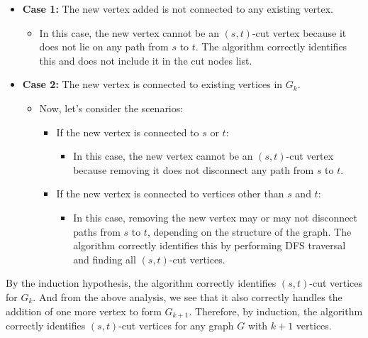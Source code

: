 \documentclass{article}
\begin{document}
            \begin{itemize}
                \item \textbf{Case 1:} The new vertex added is not connected to any existing vertex.
                \begin{itemize}
                    \item In this case, the new vertex cannot be an $(s, t)$-cut vertex because it does not lie on any path from $s$ to $t$. The algorithm correctly identifies this and does not include it in the cut nodes list.
                \end{itemize}
                
                \item \textbf{Case 2:} The new vertex is connected to existing vertices in $G_k$.
                \begin{itemize}
                    \item Now, let's consider the scenarios:
                    \begin{itemize}
                        \item If the new vertex is connected to $s$ or $t$:
                        \begin{itemize}
                            \item In this case, the new vertex cannot be an $(s, t)$-cut vertex because removing it does not disconnect any path from $s$ to $t$.
                        \end{itemize}
                        \item If the new vertex is connected to vertices other than $s$ and $t$:
                        \begin{itemize}
                            \item In this case, removing the new vertex may or may not disconnect paths from $s$ to $t$, depending on the structure of the graph. The algorithm correctly identifies this by performing DFS traversal and finding all $(s, t)$-cut vertices.
                        \end{itemize}
                    \end{itemize}
                \end{itemize}
            \end{itemize}
            
            By the induction hypothesis, the algorithm correctly identifies $(s, t)$-cut vertices for $G_k$. And from the above analysis, we see that it also correctly handles the addition of one more vertex to form $G_{k+1}$. Therefore, by induction, the algorithm correctly identifies $(s, t)$-cut vertices for any graph $G$ with $k + 1$ vertices.
            
\end{document}

